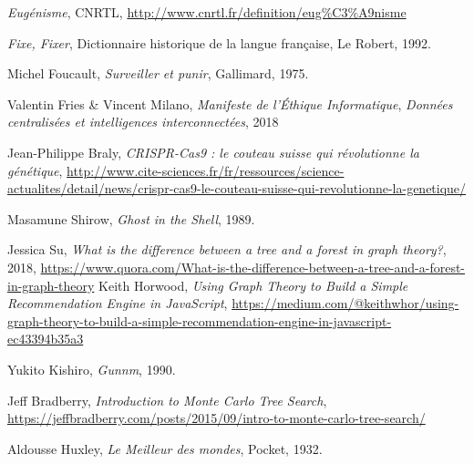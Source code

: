 \begin{thebibliography}{99}
     \emph{Eugénisme}, CNRTL, \url{http://www.cnrtl.fr/definition/eug%C3%A9nisme}

     \emph{Fixe, Fixer}, Dictionnaire historique de la langue française, Le Robert, 1992. 

     Michel Foucault, \emph{Surveiller et punir}, Gallimard, 1975.

     Valentin Fries \& Vincent Milano, \emph{Manifeste de l'Éthique Informatique}, \emph{Données centralisées et intelligences interconnectées}, 2018

     Jean-Philippe Braly, \emph{CRISPR-Cas9 : le couteau suisse qui révolutionne la génétique}, \url{http://www.cite-sciences.fr/fr/ressources/science-actualites/detail/news/crispr-cas9-le-couteau-suisse-qui-revolutionne-la-genetique/}

     Masamune Shirow, \emph{Ghost in the Shell}, 1989.

     Jessica Su, \emph{What is the difference between a tree and a forest in graph theory?}, 2018, \url{https://www.quora.com/What-is-the-difference-between-a-tree-and-a-forest-in-graph-theory}
     Keith Horwood, \emph{Using Graph Theory to Build a Simple Recommendation Engine in JavaScript}, \url{https://medium.com/@keithwhor/using-graph-theory-to-build-a-simple-recommendation-engine-in-javascript-ec43394b35a3}

     Yukito Kishiro, \emph{Gunnm}, 1990.

     Jeff Bradberry, \emph{Introduction to Monte Carlo Tree Search}, \url{https://jeffbradberry.com/posts/2015/09/intro-to-monte-carlo-tree-search/}

     Aldousse Huxley, \emph{Le Meilleur des mondes}, Pocket, 1932.


\end{thebibliography}
